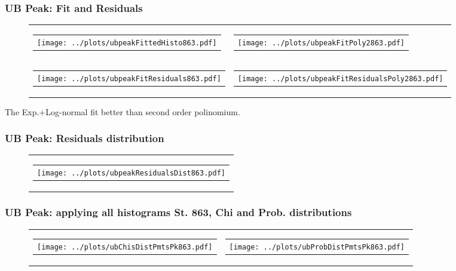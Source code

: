 \documentclass[aspectratio=169]{beamer}
\begin{document}
\begin{frame}
  \frametitle{UB Peak: Fit and Residuals}
  \begin{figure}
    \centering
    \begin{tabularx}{\textwidth}{CC}
      \begin{tabular}{l}
        \texttt{[image: ../plots/ubpeakFittedHisto863.pdf]}
      \end{tabular}
      &
      \begin{tabular}{l}
        \texttt{[image: ../plots/ubpeakFitPoly2863.pdf]}
      \end{tabular}
      \\
      \begin{tabular}{l}
        \texttt{[image: ../plots/ubpeakFitResiduals863.pdf]}
      \end{tabular}
      &
      \begin{tabular}{l}
        \texttt{[image: ../plots/ubpeakFitResidualsPoly2863.pdf]}
      \end{tabular}
    \end{tabularx}
  \end{figure}
  The Exp.+Log-normal fit better than second order polinomium.
\end{frame}


\begin{frame}
  \frametitle{UB Peak: Residuals distribution}
  \begin{figure}
    \centering
    \begin{tabularx}{\textwidth}{C}
      \begin{tabular}{l}
        \texttt{[image: ../plots/ubpeakResidualsDist863.pdf]}
      \end{tabular}
    \end{tabularx}
  \end{figure}
\end{frame}


\begin{frame}
  \frametitle{UB Peak: applying all histograms St. 863, Chi and Prob. distributions}
  \begin{figure}
    \centering
    \begin{tabularx}{\textwidth}{CC}
      \begin{tabular}{l}
        \texttt{[image: ../plots/ubChisDistPmtsPk863.pdf]}
      \end{tabular}
      &
      \begin{tabular}{l}
        \texttt{[image: ../plots/ubProbDistPmtsPk863.pdf]}
      \end{tabular}
    \end{tabularx}
  \end{figure}
\end{frame}
\end{document}

